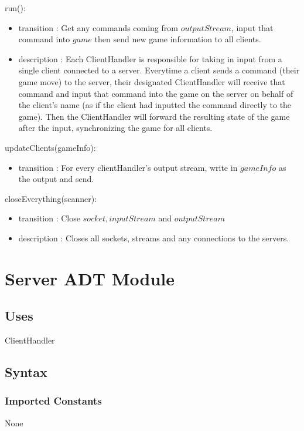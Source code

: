 \documentclass[12pt, titlepage]{article}
\begin{document}
        \noindent run():
        \begin{itemize}
        \item transition : Get any commands coming from $outputStream$, input that command into $game$ then send new game information to all clients.
        \item description : Each ClientHandler is responsible for taking in input from a single client connected to a server. Everytime a client sends a command (their game move) to the server, their designated ClientHandler will receive that command and input that command into the game on the server on behalf of the client's name (as if the client had inputted the command directly to the game). Then the ClientHandler will forward the resulting state of the game after the input, synchronizing the game for all clients.
        \end{itemize}
        
        \noindent updateClients(gameInfo):
        \begin{itemize}
        \item transition : For every clientHandler's output stream, write in $gameInfo$ as the output and send.
        \end{itemize}
        
        \noindent closeEverything(scanner):
        \begin{itemize}
        \item transition : Close $socket, inputStream$ and $outputStream$
        \item description : Closes all sockets,  streams and any connections to the servers.
        \end{itemize}
        
        
                        
        
\section* {Server ADT Module}
    \subsection* {Uses}
    ClientHandler
    \subsection* {Syntax}
    
        \subsubsection* {Imported Constants}
            None
\end{document}
